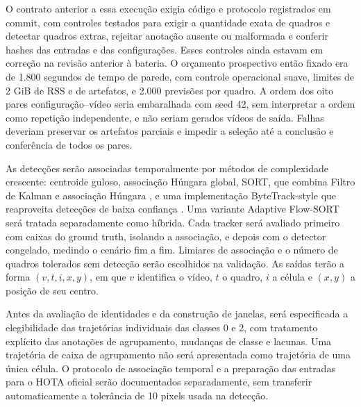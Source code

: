 O contrato anterior a essa execução exigia código e protocolo registrados em commit, com controles testados para exigir a quantidade exata de quadros e detectar quadros extras, rejeitar anotação ausente ou malformada e conferir hashes das entradas e das configurações. Esses controles ainda estavam em correção na revisão anterior à bateria. O orçamento prospectivo então fixado era de 1.800 segundos de tempo de parede, com controle operacional suave, limites de 2 GiB de RSS e de artefatos, e 2.000 previsões por quadro. A ordem dos oito pares configuração--vídeo seria embaralhada com seed 42, sem interpretar a ordem como repetição independente, e não seriam gerados vídeos de saída. Falhas deveriam preservar os artefatos parciais e impedir a seleção até a conclusão e conferência de todos os pares.

As detecções serão associadas temporalmente por métodos de complexidade crescente: centroide guloso, associação Húngara global, SORT, que combina Filtro de Kalman e associação Húngara \cite{bewley2016sort}, e uma implementação ByteTrack-style que reaproveita detecções de baixa confiança \cite{zhang2022bytetrack}. Uma variante Adaptive Flow-SORT será tratada separadamente como híbrida. Cada tracker será avaliado primeiro com caixas do ground truth, isolando a associação, e depois com o detector congelado, medindo o cenário fim a fim. Limiares de associação e o número de quadros tolerados sem detecção serão escolhidos na validação. As saídas terão a forma $(v,t,i,x,y)$, em que $v$ identifica o vídeo, $t$ o quadro, $i$ a célula e $(x,y)$ a posição de seu centro.

Antes da avaliação de identidades e da construção de janelas, será especificada a elegibilidade das trajetórias individuais das classes 0 e 2, com tratamento explícito das anotações de agrupamento, mudanças de classe e lacunas. Uma trajetória de caixa de agrupamento não será apresentada como trajetória de uma única célula. O protocolo de associação temporal e a preparação das entradas para o HOTA oficial serão documentados separadamente, sem transferir automaticamente a tolerância de 10 pixels usada na detecção.

